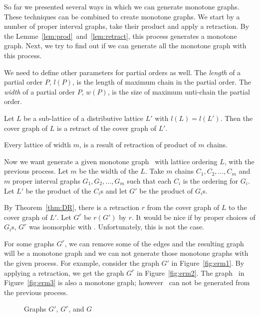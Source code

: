 So far we presented several ways in which we can generate monotone graphs.
These techniques can be combined to create monotone graphs.
We start by a number of proper interval graphs, take their product and apply a retraction.
By the Lemme~\ref{lem:prod}~and~\ref{lem:retract}, this process generates a monotone graph.
Next, we try to find out if we can generate all the monotone graph with this process.

We need to define other parameters for partial orders as well.
The \emph{length} of a partial order \(P\), \(l(P)\), is the length of maximum chain in
the partial order. The \emph{width} of a partial order \(P\),
\(w(P)\), is the size of maximum unti-chain the partial order.

\begin{theorem}  \label{thm:DR}
Let \(L\) be a sub-lattice of a distributive lattice \(L'\) with
\(l(L)=l(L')\)\@. Then the cover graph of \(L\) is a retract of the cover graph of 
\(L'\)\@.
\end{theorem}

\begin{cor}
Every lattice of width \(m\), is a result of retraction of product of
\(m\) chains.
\end{cor}

Now we want generate a given monotone graph \mG\ with lattice ordering \(L\),
with the previous process. Let \(m\) be the width of the \(L\)\@.
Take \(m\) chains \(C_1,C_2,\dotsc,C_m\) and \(m\) proper interval graphs
\(G_1,G_2,\dotsc,G_m\) such that each \(C_i\) is the ordering for
\(G_i\)\@.
Let \(L'\) be the product of the \(C_i\)s and let \(G'\)
be the product of \(G_i\)s.

By Theorem~\ref{thm:DR}, there is a retraction \(r\) from the
cover graph of \(L\) to the cover graph of \(L'\)\@.
Let \(G^r\) be \(r(G')\) by \(r\)\@.
It would be nice if by proper choices of \(G_i\)s, \(G^r\)
was isomorphic with \mG\@. Unfortunately, this is not the case.

For some graphs \(G^r\), we can remove some of the edges and
the resulting graph will be a monotone graph and we can not generate those monotone
graphs with the given process. For example, consider the graph \(G'\) in
Figure~\ref{fig:erm1}\@. By applying a retraction, we get the
graph \(G^r\) in Figure~\ref{fig:erm2}\@. The graph
\mG\ in Figure~\ref{fig:erm3} is also a monotone graph; however
\mG\ can not be generated from the previous process\@.


\begin{figure}
\hfill
\subfigure[\ensuremath{G'}]{\label{fig:erm1}}\hfill 
\subfigure[\ensuremath{G^r}]{\label{fig:erm2}}\hfill 
\subfigure[\ensuremath{G}]{\label{fig:erm3}}\hfill 
\caption{Graphs \ensuremath{G'}, \ensuremath{G^r}, and \ensuremath{G}}
\end{figure}

